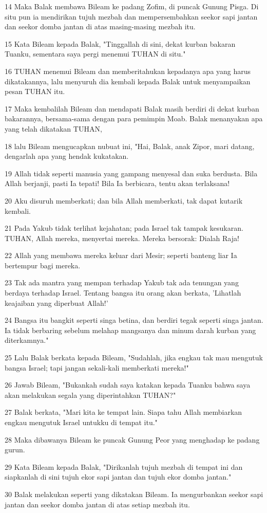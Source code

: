 \par 14 Maka Balak membawa Bileam ke padang Zofim, di puncak Gunung Pisga. Di situ pun ia mendirikan tujuh mezbah dan mempersembahkan seekor sapi jantan dan seekor domba jantan di atas masing-masing mezbah itu.
\par 15 Kata Bileam kepada Balak, "Tinggallah di sini, dekat kurban bakaran Tuanku, sementara saya pergi menemui TUHAN di situ."
\par 16 TUHAN menemui Bileam dan memberitahukan kepadanya apa yang harus dikatakannya, lalu menyuruh dia kembali kepada Balak untuk menyampaikan pesan TUHAN itu.
\par 17 Maka kembalilah Bileam dan mendapati Balak masih berdiri di dekat kurban bakarannya, bersama-sama dengan para pemimpin Moab. Balak menanyakan apa yang telah dikatakan TUHAN,
\par 18 lalu Bileam mengucapkan nubuat ini, "Hai, Balak, anak Zipor, mari datang, dengarlah apa yang hendak kukatakan.
\par 19 Allah tidak seperti manusia yang gampang menyesal dan suka berdusta. Bila Allah berjanji, pasti Ia tepati! Bila Ia berbicara, tentu akan terlaksana!
\par 20 Aku disuruh memberkati; dan bila Allah memberkati, tak dapat kutarik kembali.
\par 21 Pada Yakub tidak terlihat kejahatan; pada Israel tak tampak kesukaran. TUHAN, Allah mereka, menyertai mereka. Mereka bersorak: Dialah Raja!
\par 22 Allah yang membawa mereka keluar dari Mesir; seperti banteng liar Ia bertempur bagi mereka.
\par 23 Tak ada mantra yang mempan terhadap Yakub tak ada tenungan yang berdaya terhadap Israel. Tentang bangsa itu orang akan berkata, 'Lihatlah keajaiban yang diperbuat Allah!'
\par 24 Bangsa itu bangkit seperti singa betina, dan berdiri tegak seperti singa jantan. Ia tidak berbaring sebelum melahap mangsanya dan minum darah kurban yang diterkamnya."
\par 25 Lalu Balak berkata kepada Bileam, "Sudahlah, jika engkau tak mau mengutuk bangsa Israel; tapi jangan sekali-kali memberkati mereka!"
\par 26 Jawab Bileam, "Bukankah sudah saya katakan kepada Tuanku bahwa saya akan melakukan segala yang diperintahkan TUHAN?"
\par 27 Balak berkata, "Mari kita ke tempat lain. Siapa tahu Allah membiarkan engkau mengutuk Israel untukku di tempat itu."
\par 28 Maka dibawanya Bileam ke puncak Gunung Peor yang menghadap ke padang gurun.
\par 29 Kata Bileam kepada Balak, "Dirikanlah tujuh mezbah di tempat ini dan siapkanlah di sini tujuh ekor sapi jantan dan tujuh ekor domba jantan."
\par 30 Balak melakukan seperti yang dikatakan Bileam. Ia mengurbankan seekor sapi jantan dan seekor domba jantan di atas setiap mezbah itu.

